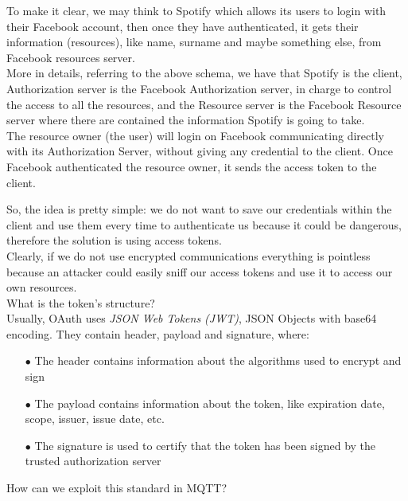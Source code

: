 \documentclass[12pt]{report}
\begin{document}
{To make it clear, we may think to Spotify which allows its users to login with their Facebook account, then once they have authenticated, it gets their information (resources), like name, surname and maybe something else, from Facebook resources server.\\
More in details, referring to the above schema, we have that Spotify is the client, Authorization server is the Facebook Authorization server, in charge to control the access to all the resources, and the Resource server is the Facebook Resource server where there are contained the information Spotify is going to take.\\
The resource owner (the user) will login on Facebook communicating directly with its Authorization Server, without giving any credential to the client. Once Facebook authenticated the resource owner, it sends the access token to the client.

So, the idea is pretty simple: we do not want to save our credentials within the client and use them every time to authenticate us because it could be dangerous, therefore the solution is using access tokens.\\
Clearly, if we do not use encrypted communications everything is pointless because an attacker could easily sniff our access tokens and use it to access our own resources.\\

What is the token's structure?\\

Usually, OAuth uses \emph{JSON Web Tokens (JWT)}, JSON Objects with base64 encoding. They contain header, payload and signature, where:

\begin{itemize}
\setlength{\itemindent}{+4mm}
  \item[$\bullet$] The header contains information about the algorithms used to encrypt and sign
  \item[$\bullet$] The payload contains information about the token, like expiration date, scope, issuer, issue date, etc.
  \item[$\bullet$] The signature is used to certify that the token has been signed by the trusted authorization server
  \end{itemize}

How can we exploit this standard in MQTT?\\

}
\end{document}
